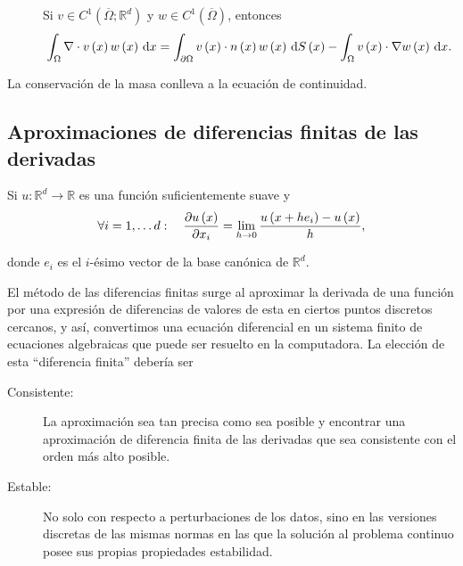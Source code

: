 \begin{theorem}
\begin{description}
        \item[]

            Si $v\in C^{1}\left(\overline{\Omega};\mathbb{R}^{d}\right)$ y
            $w\in C^{1}\left(\overline{\Omega}\right)$, entonces
            \begin{equation*}
                \int_{\Omega}\nabla\cdot v\left(x\right)
                w\left(x\right)
                \dl x=
                \int_{\partial\Omega}
                v\left(x\right)\cdot
                n\left(x\right)
                w\left(x\right)
                \dl{S\left(x\right)}-
                \int_{\Omega}
                v\left(x\right)\cdot
                \nabla w\left(x\right)
                \dl x.
            \end{equation*}
    \end{description}
\end{theorem}

La conservación de la masa conlleva a la ecuación de continuidad.

\subsection{Aproximaciones de diferencias finitas de las derivadas}

Si $u\colon\mathbb{R}^d\to\mathbb{R}$ es una función suficientemente
suave y
\begin{equation*}
    \forall i=1,\dotsc d:\quad
    \diffp{u\left(x\right)}{x_{i}}=
    \lim\limits_{h\to0}
    \dfrac{
        u\left(x+he_{i}\right)-
        u\left(x\right)}{h},
\end{equation*}

donde $e_{i}$ es el $i$-ésimo vector de la base canónica de
$\mathbb{R}^d$.

El método de las diferencias finitas surge al aproximar la derivada
de una función por una expresión de diferencias de valores de esta en
ciertos puntos discretos cercanos, y así, convertimos una ecuación
diferencial en un sistema finito de ecuaciones algebraicas que puede
ser resuelto en la computadora.
La elección de esta ``diferencia finita'' debería ser

\begin{description}
    \item[Consistente:]

        La aproximación sea tan precisa como sea posible y encontrar
        una aproximación de diferencia finita de las derivadas que
        sea consistente con el orden más alto posible.

    \item[Estable:]

        No solo con respecto a perturbaciones de los datos, sino
        en las versiones discretas de las mismas normas en las que la
        solución al problema continuo posee sus propias propiedades
        estabilidad.
\end{description}

